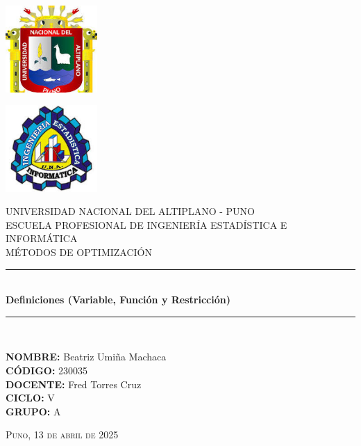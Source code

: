 \documentclass[12pt]{article}
\begin{document}
\begin{titlepage}
    \begin{center}
    
        
        \begin{minipage}{0.45\textwidth}
            \centering
            \includegraphics[width=3.5cm]{LOGOUNAP.jpg} 
        \end{minipage}
        \hfill
        \begin{minipage}{0.45\textwidth}
            \centering
            \includegraphics[width=3.5cm]{LOGOFINESI.jpg} 
        \end{minipage}
        
        \vspace{1cm}
        
    
        {\Large \textsc{UNIVERSIDAD NACIONAL DEL ALTIPLANO - PUNO}}\\[0.5cm]
        {\large \textsc{ESCUELA PROFESIONAL DE INGENIERÍA ESTADÍSTICA E INFORMÁTICA}}\\[0.4cm]
        {\large \textsc{MÉTODOS DE OPTIMIZACIÓN}}\\[1.5cm]
        
        
        \rule{\linewidth}{0.5mm} \\[0.4cm]
        {\huge \bfseries Definiciones (Variable, Función y Restricción)}\\[0.4cm]
        \rule{\linewidth}{0.5mm} \\[1.5cm]
        
    
        \begin{flushleft}
            \textbf{NOMBRE:} Beatriz Umiña Machaca \\
            \textbf{CÓDIGO:} 230035 \\
            \textbf{DOCENTE:} Fred Torres Cruz \\
            \textbf{CICLO:} V \\
            \textbf{GRUPO:} A \\
        \end{flushleft}
        
        \vfill
        \vfill
\textsc{Puno, 13 de abril de 2025}

    
    
        
    \end{center}
\end{titlepage}
\end{document}
